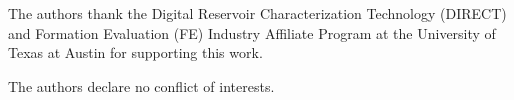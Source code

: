 \documentclass[default,iicol]{sn-jnl}
\begin{document}
\backmatter

The authors thank the Digital Reservoir Characterization Technology (DIRECT) and Formation Evaluation (FE) Industry Affiliate Program at the University of Texas at Austin for supporting this work.

The authors declare no conflict of interests.



\end{document}
